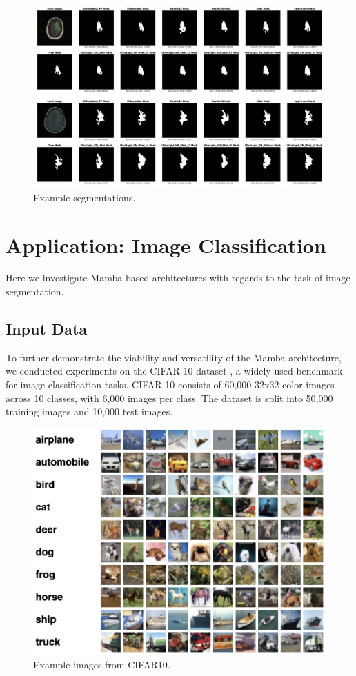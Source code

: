 \documentclass[conference]{IEEEtran}
\begin{document}
\begin{figure}[!t]
    \centering
    \includegraphics[width=\columnwidth]{imgs/masks.png}
    \caption{Example segmentations.}
    \label{fig:segs}
\end{figure}


\section{Application: Image Classification}
Here we investigate Mamba-based architectures with regards to the task of image segmentation.

\subsection{Input Data}
To further demonstrate the viability and versatility of the Mamba architecture, we conducted experiments on the CIFAR-10 dataset \cite{krizhevsky2009learning}, a widely-used benchmark for image classification tasks. CIFAR-10 consists of 60,000 32x32 color images across 10 classes, with 6,000 images per class. The dataset is split into 50,000 training images and 10,000 test images.


\begin{figure}[!t]
    \centering
    \includegraphics[width=0.75\columnwidth]{imgs/cifar_10.jpg}
    \caption{Example images from CIFAR10.}
    \label{fig:cifar}
\end{figure}
\end{document}

